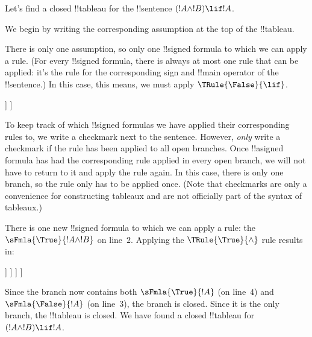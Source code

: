 \documentclass[../../../include/open-logic-section]{subfiles}
\begin{document}
      {}
      {}

\begin{ex}
Let's find a closed !!{tableau} for the !!{sentence} $(!A \land !B) \lif !A$.

We begin by writing the corresponding assumption at the top of the
!!{tableau}.
\begin{oltableau}
  [\sFmla{\False}{(\formula{A} \land \formula{B}) \lif \formula{A}},
    just = \TAss]
\end{oltableau}

There is only one assumption, so only one !!{signed formula} to which
we can apply a rule. (For every !!{signed formula}, there is always at
most one rule that can be applied: it's the rule for the corresponding
sign and !!{main operator} of the !!{sentence}.) In this case, this
means, we must apply $\TRule{\False}{\lif}$.
\begin{oltableau}
  [\sFmla{\False}{(\formula{A} \land \formula{B}) \lif \formula{A}},
    checked, just = \TAss
    [\sFmla{\True}{\formula{A} \land \formula{B}},
      just={\TRule{\False}{\lif}[1]}
      [\sFmla{\False}{\formula{A}}, just={\TRule{\False}{\lif}[1]}]
    ]
  ]
\end{oltableau}
To keep track of which !!{signed formula}s we have applied their
corresponding rules to, we write a checkmark next to the
sentence. However, \emph{only} write a checkmark if the rule has been
applied to all open branches. Once !!a{signed formula} has had the
corresponding rule applied in every open branch, we will not have to
return to it and apply the rule again. In this case, there is only one
branch, so the rule only has to be applied once. (Note that checkmarks
are only a convenience for constructing tableaux and are not
officially part of the syntax of tableaux.)

There is one new !!{signed formula} to which we can apply a rule: the
$\sFmla{\True}{!A \land !B}$ on line~$2$. Applying the
$\TRule{\True}{\land}$ rule results in:
\begin{oltableau}
  [\sFmla{\False}{(\formula{A} \land \formula{B}) \lif \formula{A}},
    checked, just = \TAss
    [\sFmla{\True}{\formula{A} \land \formula{B}},
      just={\TRule{\False}{\lif}[1]}, checked
      [\sFmla{\False}{\formula{A}}, just={\TRule{\False}{\lif}[1]}
        [\sFmla{\True}{\formula{A}}, just={\TRule{\True}{\land}[2]}
          [\sFmla{\True}{\formula{B}}, just={\TRule{\True}{\land}[2]}, close
          ]
        ]
      ]
    ]
  ]
\end{oltableau}
Since the branch now contains both $\sFmla{\True}{!A}$ (on line~$4$)
and $\sFmla{\False}{!A}$ (on line~$3$), the branch is closed. Since it
is the only branch, the !!{tableau} is closed. We have found
a closed !!{tableau} for~$(!A \land !B) \lif !A$.
\end{ex}
\end{document}
